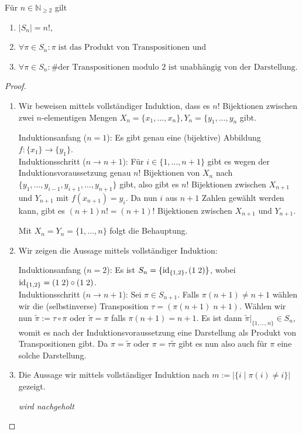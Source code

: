 \begin{proposition}\label{prop:sym_gruppe} Für $n \in \mathbb{N}_{\ge 2}$ gilt
    \begin{enumerate}
        \item $\vert S_n \vert = n!$,
        \item $\forall \pi \in S_n: \pi\;\text{ist das Produkt von Transpositionen}$ und
        \item $\forall \pi \in S_n: \text{\# der Transpositionen modulo 2 ist unabhängig von der Darstellung}$.
    \end{enumerate}
\end{proposition}
\begin{proof}{\ }
    \begin{enumerate}
        \item Wir beweisen mittels vollständiger Induktion, dass es $n!$ Bijektionen zwischen zwei $n$-elementigen Mengen $X_n = \{x_1, \ldots, x_n\}, Y_n = \{y_1, \ldots, y_n$ gibt.
        
        Induktionsanfang ($n = 1$): Es gibt genau eine (bijektive) Abbildung $f: \{x_1\} \to \{y_1\}$.\\
        Induktionsschritt ($n \to n+1$): Für $i \in \{1, \ldots, n+1\}$ gibt es wegen der Induktionsvoraussetzung genau $n!$ Bijektionen von $X_n$ nach $\{y_1, \ldots, y_{i-1}, y_{i+1}, \ldots, y_{n+1}\}$ gibt, also gibt es $n!$ Bijektionen zwischen $X_{n+1}$ und $Y_{n+1}$ mit $f(x_{n+1}) = y_i$. Da nun $i$ aus $n+1$ Zahlen gewählt werden kann, gibt es $(n+1)n! = (n+1)!$ Bijektionen zwischen $X_{n+1}$ und $Y_{n+1}$.

        Mit $X_n = Y_n = \{1, \ldots, n\}$ folgt die Behauptung.

        \item Wir zeigen die Aussage mittels vollständiger Induktion:
        
        Induktionsanfang ($n = 2$): Es ist $S_n = \{ \operatorname{id}_{\{1,2\}}, (1\; 2) \}$, wobei $\operatorname{id}_{\{1,2\}} = (1\; 2) \circ (1\; 2)$.\\
        Induktionsschritt ($n \to n+1$): Sei $\pi \in S_{n+1}$. Falls $\pi(n+1) \not= n+1$ wählen wir die (selbstinverse) Transposition $\tau = (\pi(n+1)\; n+1)$. Wählen wir nun $\tilde{\pi} := \tau \circ \pi$ oder $\tilde{\pi} = \pi$ falls $\pi(n+1) = n+1$. Es ist dann $\tilde{\pi}\vert_{\{1,\ldots,n\}} \in S_n$, womit es nach der Induktionsvoraussetzung eine Darstellung als Produkt von Transpositionen gibt. Da $\pi = \tilde\pi$ oder $\pi = \tau\tilde\pi$ gibt es nun also auch für $\pi$ eine solche Darstellung.

        \item Die Aussage wir mittels vollständiger Induktion nach $m := \vert \{ i \mid \pi(i) \not= i \}\vert$ gezeigt.
        
        \textit{wird nachgeholt}
    \end{enumerate}
\end{proof}

